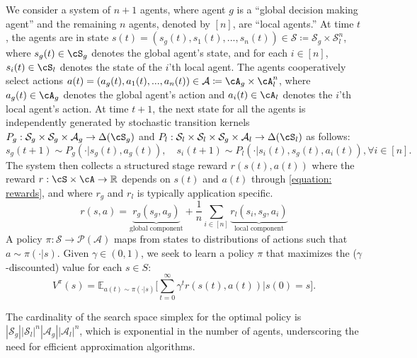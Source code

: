\documentclass{article}
\theoremstyle{plain}
\theoremstyle{definition}
\begin{document}
We consider a system of $n+1$ agents, where agent $g$ is a ``global decision making agent'' and the remaining $n$ agents, denoted by $[n]$, are ``local agents.'' At time $t$, the agents are in state $s(t) = (s_g(t), s_1(t), ..., s_n(t))\in\mathcal{S}\coloneq \mathcal{S}_g\times\mathcal{S}_l^n$, where $s_g(t) \in \cS_g$ denotes the global agent's state, and for each $i \in [n]$, $s_i(t) \in \cS_l$ denotes the state of the $i$'th local agent. The agents cooperatively select actions $a(t) = (a_g(t), a_1(t), ..., a_n(t))\in\mathcal{A}\coloneqq \cA_g\times\cA_l^n$, where $a_g(t)\in \cA_g$ denotes the global agent's action and $a_i(t) \in \cA_l$ denotes the $i$'th local agent's action. At time $t+1$, the next state for all the agents is independently generated by stochastic transition kernels
$P_g:\mathcal{S}_g\times\mathcal{S}_g\times\mathcal{A}_g\to\Delta(\cS_g)$ and $P_l:\mathcal{S}_l\times\mathcal{S}_l\times\mathcal{S}_g\times\mathcal{A}_l\to\Delta(\cS_l)$ as follows:
\begin{equation}\label{equation: global_transition}s_g(t+1) \sim P_g(\cdot|s_g(t), a_g(t)),\quad s_i(t+1) \sim P_l(\cdot|s_i(t), s_g(t), a_i(t)), \forall i\in [n].\end{equation}
The system then collects a structured stage reward $r(s(t), a(t))$ where the reward $r:\cS\times\cA\to\mathbb{R}$ depends on $s(t)$ and $a(t)$ through \cref{equation: rewards}, and where $r_g$ and $r_l$ is typically application specific.
\begin{equation}\label{equation: rewards}
    r(s, a) = \underbrace{r_g(s_g, a_g)}_{{\text{global component}}} + \frac{1}{n} \sum_{i\in [n]} \underbrace{r_l(s_i, s_g, a_i)}_{\text{local component}}
\end{equation}
A policy $\pi:\mathcal{S}\to\mathcal{P}(\mathcal{A})$ maps from states to distributions of actions such that $a \sim \pi(\cdot|s)$. Given $\gamma \in (0, 1)$, we seek to learn a policy $\pi$ that maximizes the ($\gamma$-discounted) value for each $s\in S$: \begin{equation}V^{\pi}(s)=\mathbb{E}_{a(t)\sim\pi(\cdot|s)}\Big[\sum_{t=0}^\infty \gamma^t r(s(t), a(t))|s(0)=s\Big].\end{equation}

The cardinality of the search space simplex for the optimal policy is $|\mathcal{S}_g||\mathcal{S}_l|^n|\mathcal{A}_g||\mathcal{A}_l|^n$, which is exponential in the number of agents, underscoring the need for efficient approximation algorithms. 
\end{document}
